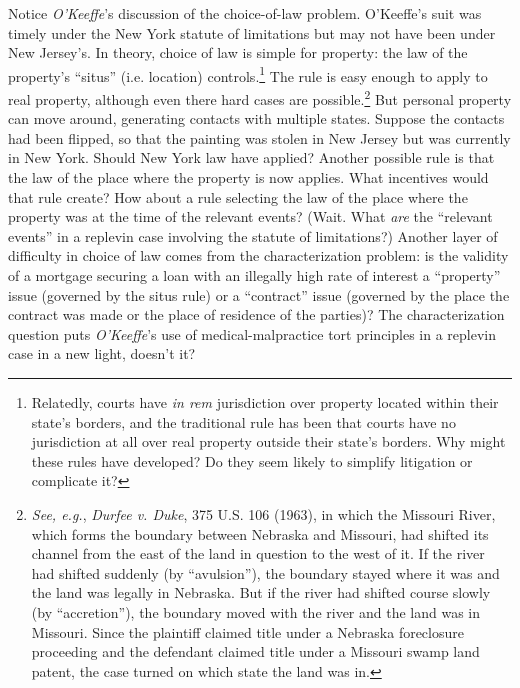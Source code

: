 \item Notice \textit{O'Keeffe}'s discussion of the choice-of-law problem.
O'Keeffe's suit was timely under the New York statute of limitations but may
not have been under New Jersey's. In theory, choice of law is simple for
property: the law of the property's ``situs'' (i.e. location)
controls.\footnote{Relatedly, courts have \textit{in rem} jurisdiction over
property located within their state's borders, and the traditional rule has
been that courts have no jurisdiction at all over real property outside their
state's borders. Why might these rules have developed? Do they seem likely to
simplify litigation or complicate it?} The rule is easy enough to apply to real
property, although even there hard cases are possible.\footnote{\textit{See,
e.g.}, \textit{Durfee v. Duke}, 375 U.S. 106 (1963), in which the Missouri
River, which forms the boundary between Nebraska and Missouri, had shifted its
channel from the east of the land in question to the west of it. If the river
had shifted suddenly (by ``avulsion''), the boundary stayed where it was and
the land was legally in Nebraska. But if the river had shifted course slowly
(by ``accretion''), the boundary moved with the river and the land was in
Missouri. Since the plaintiff claimed title under a Nebraska foreclosure
proceeding and the defendant claimed title under a Missouri swamp land patent,
the case turned on which state the land was in.} But personal property can move
around, generating contacts with multiple states. Suppose the contacts had been
flipped, so that the painting was stolen in New Jersey but was currently in New
York. Should New York law have applied? Another possible rule is that the law
of the place where the property is now applies. What incentives would that rule
create? How about a rule selecting the law of the place where the property was
at the time of the relevant events? (Wait. What \textit{are} the ``relevant
events'' in a replevin case involving the statute of limitations?) Another
layer of difficulty in choice of law comes from the characterization problem:
is the validity of a mortgage securing a loan with an illegally high rate of
interest a ``property'' issue (governed by the situs rule) or a ``contract''
issue (governed by the place the contract was made or the place of residence of
the parties)? The characterization question puts \textit{O'Keeffe}'s use of
medical-malpractice tort principles in a replevin case in a new light, doesn't
it?

